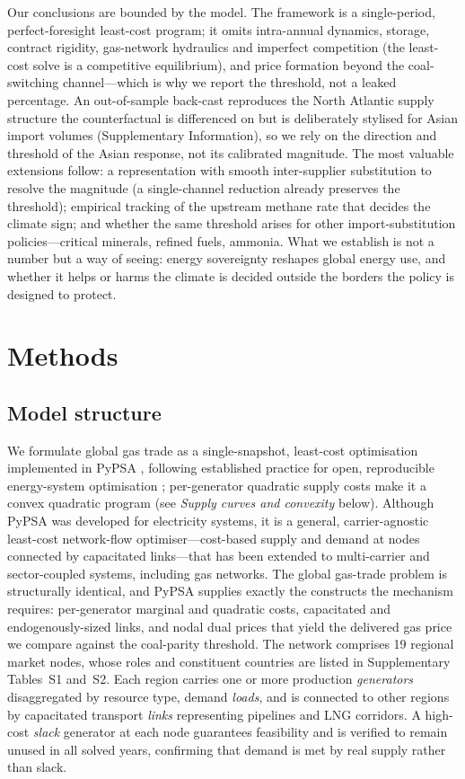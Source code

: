 \documentclass[sn-nature]{sn-jnl}
\theoremstyle{thmstyleone}%
\theoremstyle{thmstyletwo}%
\theoremstyle{thmstylethree}%
\begin{document}
Our conclusions are bounded by the model. The framework is a single-period,
perfect-foresight least-cost program; it omits intra-annual dynamics, storage,
contract rigidity, gas-network hydraulics and imperfect competition (the
least-cost solve is a competitive equilibrium), and price formation beyond the
coal-switching channel---which is why we report the threshold, not a leaked
percentage. An out-of-sample
back-cast reproduces the North Atlantic supply structure the counterfactual is
differenced on but is deliberately stylised for Asian import volumes
(Supplementary Information), so we rely on the direction and threshold of the
Asian response, not its calibrated magnitude. The most valuable extensions
follow: a representation with smooth inter-supplier substitution to resolve the
magnitude (a single-channel reduction already preserves the threshold);
empirical tracking of the upstream methane rate that decides the climate sign;
and whether the same threshold arises for other import-substitution
policies---critical minerals, refined fuels, ammonia. What we establish is not a
number but a way of seeing: energy sovereignty reshapes global energy use, and
whether it helps or harms the climate is decided outside the borders the policy
is designed to protect.

\section*{Methods}\label{sec:methods}
\subsection*{Model structure}
We formulate global gas trade as a single-snapshot, least-cost optimisation
implemented in PyPSA \citep{pypsa, HorschPyPSAEur2018}, following established
practice for open, reproducible energy-system optimisation
\citep{Pfenninger2014, DeCarolis2017, Chang2021, Ringkjob2018}; per-generator quadratic supply costs make
it a convex quadratic program (see \emph{Supply curves and convexity} below).
Although PyPSA was developed for electricity systems, it is a general,
carrier-agnostic least-cost network-flow optimiser---cost-based supply and
demand at nodes connected by capacitated links---that has been extended to
multi-carrier and sector-coupled systems, including gas networks. The global
gas-trade problem is structurally identical, and PyPSA supplies exactly the
constructs the mechanism requires: per-generator marginal and quadratic costs,
capacitated and endogenously-sized links, and nodal dual prices that yield the
delivered gas price we compare against the coal-parity threshold. The network comprises 19
regional market nodes, whose roles and constituent countries are listed in
Supplementary Tables~S1 and~S2. Each region carries one or
more production \emph{generators} disaggregated by resource type, demand
\emph{loads}, and is connected to other regions by capacitated transport
\emph{links} representing pipelines and LNG corridors. A high-cost
\emph{slack} generator at each node guarantees feasibility and is verified
to remain unused in all solved years, confirming that demand is met by real
supply rather than slack.
\end{document}
